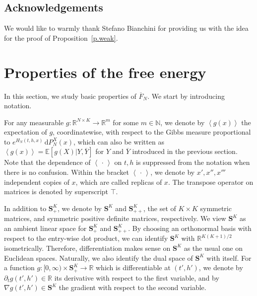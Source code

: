 \documentclass[10pt]{amsart}
\theoremstyle{definition}\newtheorem{defi}[theo]{Definition}\newtheorem{rema}[theo]{Remark}\newtheorem{exam}[theo]{Example}\newtheorem{exem}[theo]{Example}\newtheorem{nota}[theo]{Notation}
\newcommand{\N}{\mathbb{N}}
\newcommand{\R}{\mathbb{R}}
\newcommand{\E}{\mathbb{E}}
\renewcommand{\S}{\mathbf{S}}
\renewcommand{\d}{\mathrm{d}}
\renewcommand{\bar}{\overline}
\newcommand{\la}{\left\langle}
\newcommand{\ra}{\right\rangle}
\begin{document}
\subsection*{Acknowledgements}
We would like to warmly thank Stefano Bianchini for providing us with the idea for the proof of Proposition~\ref{p.weak}.

\section{Properties of the free energy}\label{s.prop.F_N}

In this section, we study basic properties of $\bar F_N$. We start by introducing notation.

For any measurable $g:\R^{N\times K}\to \R^m$ {for some $m\in\N$}, we denote by $\la g(x)\ra$ the expectation of $g${, coordinatewise, } with respect to the Gibbs measure proportional to $e^{H_N(t,h,x)} \, \d P^X_N(x)$, which can also be written as $\la g(x)\ra = \E [g(X)|Y,\bar Y]$ for $Y$ and $\bar Y$ introduced in the previous section. Note that the dependence of $\la\, \cdot \,\ra$ on $t,h$ is suppressed from the notation when there is no confusion. Within the bracket $\la\, \cdot \,\ra$, we denote by $x',x'',x'''$ independent copies of $x$, which are called replicas of $x$. The transpose operator on matrices is denoted by superscript $\intercal$.


In addition to $\S^K_+$, we denote by $\S^K$ and $\S^K_{++}$, the set of $K\times K$ symmetric matrices, and symmetric positive definite matrices, respectively. We view $\S^K$ as an ambient linear space for $\S^K_+$ and $\S^K_{++}$. By choosing an orthonormal basis with respect to the entry-wise dot product, we can identify $\S^K$ with $\R^{K(K+1)/2}$ isometrically. Therefore, differentiation makes sense on $\S^K$ as the usual one on Euclidean spaces. Naturally, we also identify the dual space of $\S^K$ with itself. For a function $g:[0,\infty)\times \S^K_+\to\R$ which is differentiable at $(t',h')$, we denote by $\partial_t g(t',h')\in\R$ its derivative with respect to the first variable, and by $\nabla g(t',h')\in\S^K$ the gradient with respect to the second variable.
\end{document}
